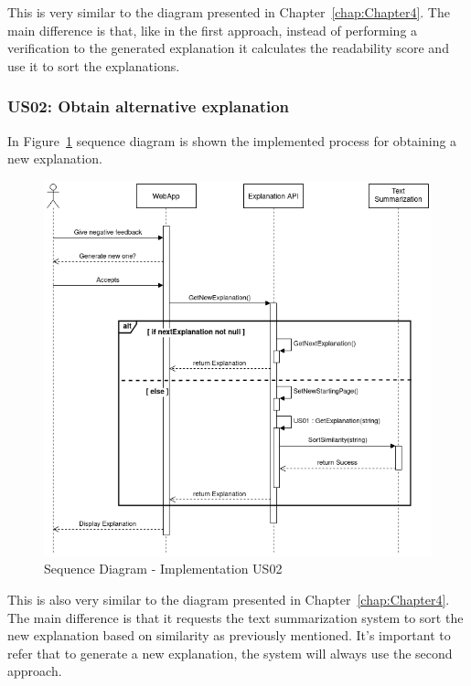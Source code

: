 This is very similar to the diagram presented in Chapter~\ref{chap:Chapter4}.
The main difference is that, like in the first approach, instead of performing a verification to the generated explanation it calculates the readability score and use it to sort the explanations.

\subsubsection{US02: Obtain alternative explanation}

In Figure~\ref{fig:uc02Imp} sequence diagram is shown the implemented process for obtaining a new explanation.

\begin{figure}[H]
\centering
\includegraphics[scale=0.45]{ch5/assets/US02_SD_Implement.png}
\caption[Sequence Diagram Implementation US02]{Sequence Diagram - Implementation US02}
\label{fig:uc02Imp}
\end{figure}

This is also very similar to the diagram presented in Chapter~\ref{chap:Chapter4}.
The main difference is that it requests the text summarization system to sort the new explanation based on similarity as previously mentioned.
It's important to refer that to generate a new explanation, the system will always use the second approach.


